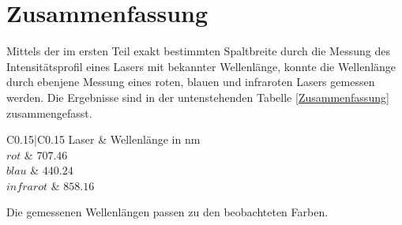 %

 

\section{Zusammenfassung}

Mittels der im ersten Teil exakt bestimmten Spaltbreite durch die Messung des Intensitätsprofil eines Lasers mit bekannter Wellenlänge, konnte die Wellenlänge durch ebenjene Messung eines roten, blauen und infraroten Lasers gemessen werden. Die Ergebnisse sind  in der untenstehenden Tabelle \ref{Zusammenfassung} zusammengefasst.


\begin{table}[H]
\centering
\label{Zusammenfassung}
	\caption{Zusammenfassung der ermittelten Wellenlängen der unbekannten Laser }
	\begin{tabular}{C{0.15\linewidth}|C{0.15\linewidth}}
		Laser & Wellenlänge in nm\\
		\hline \addlinespace[1ex] 
		$ rot $ & $707.46$\\
		$ blau $ & $440.24$\\
		$ infrarot $ & $858.16$\\
	\end{tabular}
\end{table}

Die gemessenen Wellenlängen passen zu den beobachteten Farben. 

%


